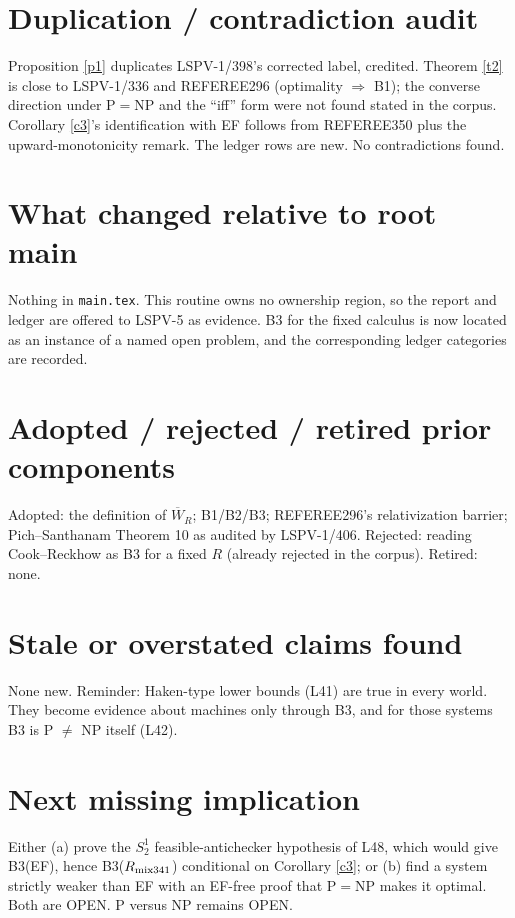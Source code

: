 \documentclass[11pt]{article}
\newcommand{\Wb}{\overline W}
\begin{document}
\section*{Duplication / contradiction audit}
Proposition \ref{p1} duplicates LSPV-1/398's corrected label, credited. Theorem \ref{t2} is
close to LSPV-1/336 and REFEREE296 (optimality $\Rightarrow$ B1); the converse direction
under $\mathrm P=\mathrm{NP}$ and the ``iff'' form were not found stated in the corpus. Corollary
\ref{c3}'s identification with EF follows from REFEREE350 plus the upward-monotonicity remark.
The ledger rows are new. No contradictions found.

\section*{What changed relative to root main}
Nothing in \texttt{main.tex}. This routine owns no ownership region, so the report and ledger
are offered to LSPV-5 as evidence. B3 for the fixed calculus is now located as an instance of
a named open problem, and the corresponding ledger categories are recorded.

\section*{Adopted / rejected / retired prior components}
Adopted: the definition of $\Wb_R$; B1/B2/B3; REFEREE296's relativization barrier;
Pich--Santhanam Theorem 10 as audited by LSPV-1/406. Rejected: reading Cook--Reckhow as B3
for a fixed $R$ (already rejected in the corpus). Retired: none.

\section*{Stale or overstated claims found}
None new. Reminder: Haken-type lower bounds (L41) are true in every world. They become
evidence about machines only through B3, and for those systems B3 is P $\ne$ NP itself (L42).

\section*{Next missing implication}
Either (a) prove the $S^1_2$ feasible-antichecker hypothesis of L48, which would give
B3(EF), hence B3($R_{\rm mix341}$) conditional on Corollary \ref{c3}; or (b) find a
system strictly weaker than EF with an EF-free proof that $\mathrm P=\mathrm{NP}$ makes it
optimal. Both are OPEN. P versus NP remains OPEN.

\end{document}
